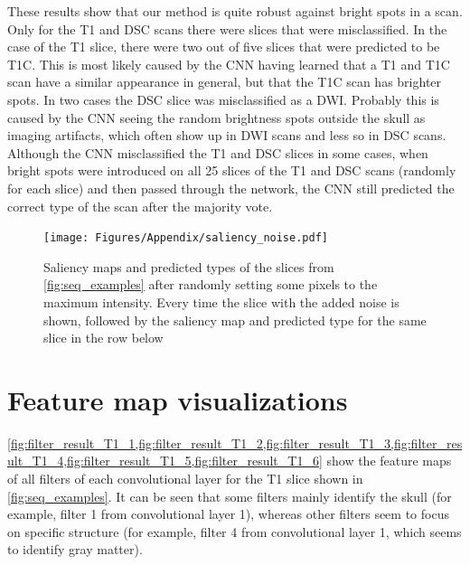 \begin{subappendices}
These results show that our method is quite robust against bright spots in a \gls{scan}.
Only for the \gls{T1} and \gls{DSC} \glspl{scan} there were \glspl{slice} that were misclassified.
In the case of the \gls{T1} \gls{slice}, there were two out of five \glspl{slice} that were predicted to be \gls{T1C}.
This is most likely caused by the \gls{CNN} having learned that a \gls{T1} and \gls{T1C} \gls{scan} have a similar appearance in general, but that the \gls{T1C} \gls{scan} has brighter spots.
In two cases the \gls{DSC} \gls{slice} was misclassified as a \gls{DWI}.
Probably this is caused by the \gls{CNN} seeing the random brightness spots outside the skull as imaging artifacts, which often show up in \gls{DWI} \glspl{scan} and less so in \gls{DSC} \glspl{scan}.
Although the \gls{CNN} misclassified the \gls{T1} and \gls{DSC} \glspl{slice} in some cases, when bright spots were introduced on all \num{25} \glspl{slice} of the \gls{T1} and \gls{DSC} \glspl{scan} (randomly for each \gls{slice}) and then passed through the network, the \gls{CNN} still predicted the correct \gls{type} of the \gls{scan} after the majority vote.

\begin{figure}[ht]
    \centering
    \texttt{[image: Figures/Appendix/saliency\_noise.pdf]}
    \caption{Saliency maps and predicted \glspl{type} of the \glspl{slice} from \cref{fig:seq_examples} after randomly setting some pixels to the maximum intensity.
    Every time the \gls{slice} with the added noise is shown, followed by the saliency map and predicted \gls{type} for the same \gls{slice} in the row below}\label{fig:bright_noise}
\end{figure}



\clearpage

\section{Feature map visualizations}\label{app:filtervis}

\cref{fig:filter_result_T1_1,fig:filter_result_T1_2,fig:filter_result_T1_3,fig:filter_result_T1_4,fig:filter_result_T1_5,fig:filter_result_T1_6} show the feature maps of all filters of each convolutional layer for the \gls{T1} \gls{slice} shown in \cref{fig:seq_examples}.
It can be seen that some filters mainly identify the skull (for example, filter 1 from convolutional layer 1), whereas other filters seem to focus on specific structure (for example, filter 4 from convolutional layer 1, which seems to identify gray matter).


\end{subappendices}
